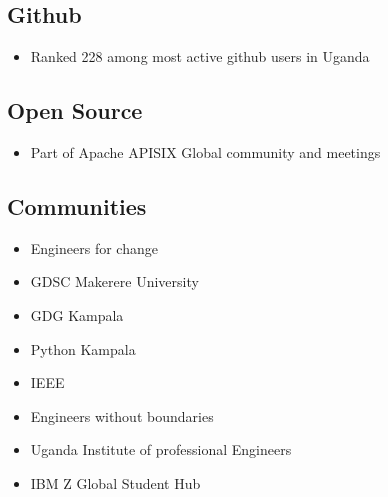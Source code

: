 \documentclass[a4paper,twocolumn]{article}
\begin{document}
        \subsection*{Github}
        \begin{itemize}
            \item Ranked 228 among most active github users in Uganda
        \end{itemize}
    
        \subsection*{Open Source}
        \begin{itemize}
            \item Part of Apache APISIX Global community and meetings
        \end{itemize}
    
        \subsection*{Communities}
        \begin{itemize}
            \item Engineers for change
            \item GDSC Makerere University
            \item GDG Kampala
            \item Python Kampala
            \item IEEE
            \item Engineers without boundaries
            \item Uganda Institute of professional Engineers
            \item IBM Z Global Student Hub
        \end{itemize}
\end{document}

